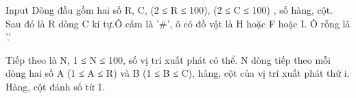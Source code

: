 Input
Dòng đầu gồm hai số R, C, (2 ≤ R ≤ 100), (2 ≤ C ≤ 100) , số hàng, cột. Sau đó là R dòng C kí tự.Ô cấm là '\#', ô có đồ vật là H hoặc F hoặc I.  Ô rỗng là '.'  

   Tiếp theo là N, 1 ≤ N ≤ 100, số vị trí xuất phát có thể. N dòng tiếp theo mỗi dòng hai số A (1 ≤ A ≤ R) và B (1 ≤ B ≤ C),  hàng, cột của vị trí xuất phát thứ i.  Hàng, cột đánh số từ 1.